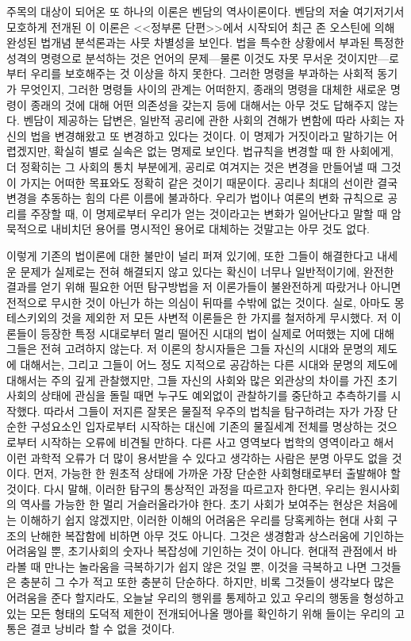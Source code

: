 주목의 대상이 되어온 또 하나의 이론은 벤담의 역사이론이다.
벤담의 저술 여기저기서 모호하게 
전개된 이 이론은 <<정부론 단편>>에서 시작되어 최근 존 오스틴에 의해 완성된
법개념 분석론과는 사뭇 차별성을 보인다.
법을 특수한 상황에서 부과된 특정한 성격의 명령으로 분석하는 것은
언어의 문제---물론 이것도 자못 무서운 것이지만---로부터 우리를 보호해주는 것
이상을 하지 못한다.
그러한 명령을 부과하는 사회적 동기가 무엇인지,
그러한 명령들 사이의 관계는 어떠한지,
종래의 명령을 대체한 새로운 명령이 종래의 것에 대해
어떤 의존성을 갖는지 등에 대해서는
아무 것도 답해주지 않는다.
벤담이 제공하는 답변은,
일반적 공리에 관한 사회의 견해가 변함에 따라
사회는 자신의 법을 변경해왔고 또 변경하고 있다는 것이다.
이 명제가 거짓이라고 말하기는 어렵겠지만,
확실히 별로 실속은 없는 명제로 보인다.
법규칙을 변경할 때 한 사회에게, 더 정확히는 그 사회의 통치 부분에게,
공리로 여겨지는 것은 변경을 만들어낼 때 그것이 가지는 어떠한 목표와도
정확히 같은 것이기 때문이다.
공리나 최대의 선이란 결국 변경을 추동하는 힘의 다른 이름에 불과하다.
우리가 법이나 여론의 변화 규칙으로 공리를 주장할 때,
이 명제로부터 우리가 얻는 것이라고는
변화가 일어난다고 말할 때 암묵적으로 내비치던 용어를
명시적인 용어로 대체하는 것말고는 아무 것도 없다.

이렇게 기존의 법이론에 대한 불만이 널리 퍼져 있기에,
또한 그들이 해결한다고 내세운 문제가 실제로는 전혀 해결되지 않고 있다는
확신이 너무나 일반적이기에,
완전한 결과를 얻기 위해 필요한 어떤 탐구방법을 저 이론가들이
불완전하게 따랐거나 아니면 전적으로 무시한 것이 아닌가 하는 의심이
뒤따를 수밖에 없는 것이다.
실로, 아마도 몽테스키외의 것을 제외한 저 모든 사변적 이론들은
한 가지를 철저하게 무시했다.
저 이론들이 등장한 특정 시대로부터 멀리 떨어진 시대의 법이 실제로
어떠했는 지에 대해 그들은 전혀 고려하지 않는다.
저 이론의 창시자들은 그들 자신의 시대와 문명의 제도에 대해서는,
그리고 그들이 어느 정도 지적으로 공감하는 다른 시대와 문명의 제도에 대해서는
주의 깊게 관찰했지만,
그들 자신의 사회와 많은 외관상의 차이를 가진 초기사회의 상태에
관심을 돌릴 때면 누구도 예외없이 관찰하기를 중단하고 추측하기를 시작했다.
따라서 그들이 저지른 잘못은 물질적 우주의 법칙을 탐구하려는 자가
가장 단순한 구성요소인 입자로부터 시작하는 대신에
기존의 물질세계 전체를 명상하는 것으로부터 시작하는 오류에 비견될 만하다.
다른 사고 영역보다 법학의 영역이라고 해서 이런 과학적 오류가 더 많이
용서받을 수 있다고 생각하는 사람은 분명 아무도 없을 것이다.
먼저, 가능한 한 원초적 상태에 가까운 가장 단순한 사회형태로부터
출발해야 할 것이다.
다시 말해, 이러한 탐구의 통상적인 과정을 따르고자 한다면,
우리는 원시사회의 역사를 가능한 한 멀리 거슬러올라가야 한다.
초기 사회가 보여주는 현상은 처음에는 이해하기 쉽지 않겠지만,
이러한 이해의 어려움은 우리를 당혹케하는 현대 사회 구조의
난해한 복잡함에 비하면 아무 것도 아니다.
그것은 생경함과 상스러움에 기인하는 어려움일 뿐,
초기사회의 숫자나 복잡성에 기인하는 것이 아니다.
현대적 관점에서 바라볼 때 만나는 놀라움을 극복하기가
쉽지 않은 것일 뿐, 이것을 극복하고 나면 그것들은 충분히 그 수가 적고
또한 충분히 단순하다.
하지만, 비록 그것들이 생각보다 많은 어려움을 준다 할지라도,
오늘날 우리의 행위를 통제하고 있고 우리의 행동을 형성하고 있는
모든 형태의 도덕적 제한이 전개되어나올 맹아를 확인하기 위해 들이는
우리의 고통은 결코 낭비라 할 수 없을 것이다.

